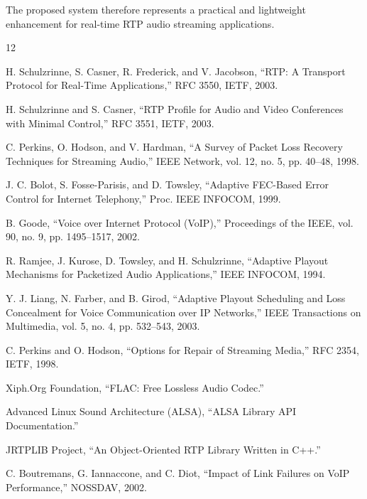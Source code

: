 \documentclass[conference]{IEEEtran}
\begin{document}
The proposed system therefore represents a practical and lightweight enhancement for real-time RTP audio streaming applications.

\begin{thebibliography}{12}

H. Schulzrinne, S. Casner, R. Frederick, and V. Jacobson,
``RTP: A Transport Protocol for Real-Time Applications,''
RFC 3550, IETF, 2003.

H. Schulzrinne and S. Casner,
``RTP Profile for Audio and Video Conferences with Minimal Control,''
RFC 3551, IETF, 2003.

C. Perkins, O. Hodson, and V. Hardman,
``A Survey of Packet Loss Recovery Techniques for Streaming Audio,''
IEEE Network, vol. 12, no. 5, pp. 40--48, 1998.

J. C. Bolot, S. Fosse-Parisis, and D. Towsley,
``Adaptive FEC-Based Error Control for Internet Telephony,''
Proc. IEEE INFOCOM, 1999.

B. Goode,
``Voice over Internet Protocol (VoIP),''
Proceedings of the IEEE,
vol. 90,
no. 9,
pp. 1495--1517,
2002.

R. Ramjee, J. Kurose, D. Towsley, and H. Schulzrinne,
``Adaptive Playout Mechanisms for Packetized Audio Applications,''
IEEE INFOCOM, 1994.

Y. J. Liang, N. Farber, and B. Girod,
``Adaptive Playout Scheduling and Loss Concealment for Voice Communication over IP Networks,''
IEEE Transactions on Multimedia,
vol. 5,
no. 4,
pp. 532--543,
2003.

C. Perkins and O. Hodson,
``Options for Repair of Streaming Media,''
RFC 2354,
IETF,
1998.

Xiph.Org Foundation,
``FLAC: Free Lossless Audio Codec.''

Advanced Linux Sound Architecture (ALSA),
``ALSA Library API Documentation.''

JRTPLIB Project,
``An Object-Oriented RTP Library Written in C++.''

C. Boutremans, G. Iannaccone, and C. Diot,
``Impact of Link Failures on VoIP Performance,''
NOSSDAV, 2002.

\end{thebibliography}
\end{document}
